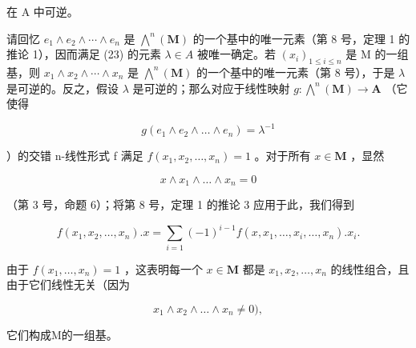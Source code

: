 在 A 中可逆。

请回忆 \(e_{1} \wedge e_{2} \wedge \cdots \wedge e_{n}\) 是 \(\bigwedge^{n}(\mathbf{M})\) 的一个基中的唯一元素（第 8 号，定理 1 的推论 1），因而满足 (23) 的元素 \(\lambda \in A\) 被唯一确定。若 \((x_{i})_{1 \leqslant i \leqslant n}\) 是 M 的一组基，则 \(x_{1} \wedge x_{2} \wedge \cdots \wedge x_{n}\) 是 \(\bigwedge^{n}(\mathbf{M})\) 的一个基中的唯一元素（第 8 号），于是 \(\lambda\) 是可逆的。反之，假设 \(\lambda\) 是可逆的；那么对应于线性映射 \(g: \bigwedge^{n}(\mathbf{M}) \to \mathbf{A}\) （它使得

\[
g (e _ {1} \wedge e _ {2} \wedge \dots \wedge e _ {n}) = \lambda^ {- 1}
\]

）的交错 n-线性形式 f 满足 \(f(x_{1}, x_{2}, \ldots, x_{n}) = 1\) 。对于所有 \(x \in \mathbf{M}\) ，显然

\[
x \wedge x _ {1} \wedge \dots \wedge x _ {n} = 0
\]

（第 3 号，命题 6）；将第 8 号，定理 1 的推论 3 应用于此，我们得到

\[
f (x _ {1}, x _ {2}, \dots , x _ {n}). x = \sum_ {i = 1} (- 1) ^ {i - 1} f (x, x _ {1}, \dots , \hat {x} _ {i}, \dots , x _ {n}). x _ {i}.
\]

由于 \(f(x_{1},\ldots ,x_{n}) = 1\) ，这表明每一个 \(x\in \mathbf{M}\) 都是 \(x_{1},x_{2},\ldots ,x_{n}\) 的线性组合，且由于它们线性无关（因为

\[
x _ {1} \wedge x _ {2} \wedge \dots \wedge x _ {n} \neq 0),
\]

它们构成M的一组基。


